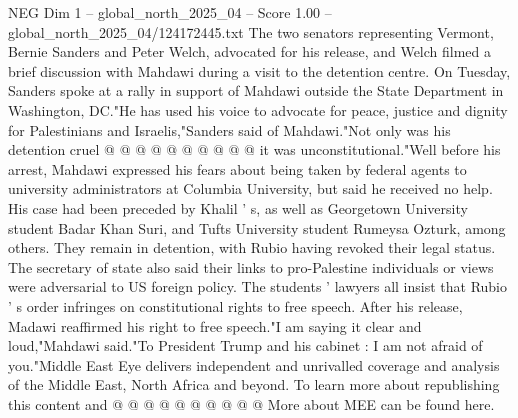 \begin{textsample}{NEG Dim 1 – global\_north\_2025\_04 – Score 1.00 – global\_north\_2025\_04/124172445.txt}
The two senators representing Vermont, Bernie Sanders and Peter Welch, advocated for his release, and Welch filmed a brief discussion with Mahdawi during a visit to the detention centre.
On Tuesday, Sanders spoke at a rally in support of Mahdawi outside the State Department in Washington, DC."He has used his voice to advocate for peace, justice and dignity for Palestinians and Israelis,"Sanders said of Mahdawi."Not only was his detention cruel @ @ @ @ @ @ @ @ @ @ it was unconstitutional."Well before his arrest, Mahdawi expressed his fears about being taken by federal agents to university administrators at Columbia University, but said he received no help.
His case had been preceded by Khalil ' s, as well as Georgetown University student Badar Khan Suri, and Tufts University student Rumeysa Ozturk, among others.
They remain in detention, with Rubio having revoked their legal status.
The secretary of state also said their links to pro-Palestine individuals or views were adversarial to US foreign policy.
The students ' lawyers all insist that Rubio ' s order infringes on constitutional rights to free speech.
After his release, Madawi reaffirmed his right to free speech."I am saying it clear and loud,"Mahdawi said."To President Trump and his cabinet : I am not afraid of you."Middle East Eye delivers independent and unrivalled coverage and analysis of the Middle East, North Africa and beyond.
To learn more about republishing this content and @ @ @ @ @ @ @ @ @ @ More about MEE can be found here.

\end{textsample}
